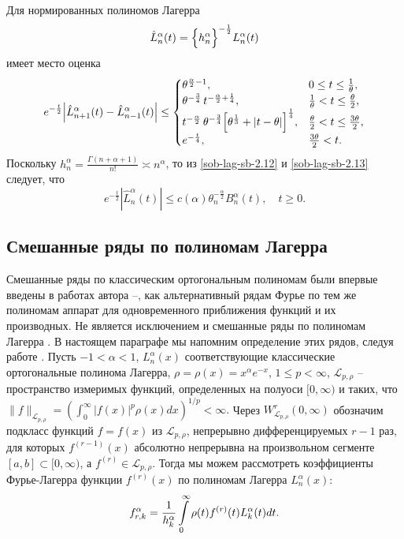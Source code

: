 Для нормированных полиномов Лагерра
\begin{equation}\label{sob-lag-sb-2.13}
\hat{L}_n^\alpha(t)=
\Bigl\{h_n^\alpha \Bigr\}^{-\frac{1}{2}} L_n^\alpha(t)
\end{equation}
имеет место оценка \cite{sob-lag-sb-AskeyWaiger}
\begin{equation}\label{sob-lag-sb-2.14}
e^{-\frac{t}{2}}
\Bigl|
\hat{L}_{n+1}^\alpha(t)-
\hat{L}_{n-1}^\alpha(t)
\Bigr|\le
\begin{cases}
\theta^{\frac{\alpha}{2}-1}, &0 \le t \le \frac{1}{\theta},\\
\theta^{-\frac{3}{4}}\,t^{-\frac{\alpha}{2} + \frac{1}{4}}, & \frac{1}{\theta} < t \le \frac{\theta}{2},\\
t^{-\frac{\alpha}{2}}\,
\theta^{-\frac{3}{4}}
\Bigl[
\theta^{\frac{1}{3}}+|t-\theta|
\Bigr]^{\frac{1}{4}}, & \frac{\theta}{2} < t \le \frac{3\theta}{2},\\
e^{-\frac{t}{4}}, &\frac{3\theta}{2}< t.
\end{cases}
\end{equation}
Поскольку $h_n^\alpha=\frac{\Gamma(n+\alpha+1)}{n!} \asymp n^\alpha$, то из \eqref{sob-lag-sb-2.12} и \eqref{sob-lag-sb-2.13} следует, что
\begin{equation}\label{sob-lag-sb-2.15}
e^{-\frac{t}{2}}
|\hat{L}_n^\alpha(t)|\le
c(\alpha)\theta_n^{-\frac{\alpha}{2}}B_n^\alpha(t), \quad t \ge 0.
\end{equation}

\subsection{Смешанные ряды по полиномам Лагерра}
Смешанные ряды по классическим ортогональным полиномам были впервые введены в работах автора \cite{sob-lag-sb-Shar11}--\cite{sob-lag-sb-Shar16}, как альтернативный
рядам Фурье по тем же полиномам аппарат для одновременного приближения функций и их производных. Не является исключением и смешанные ряды по полиномам Лагерра \cite{sob-lag-sb-Shar13}. В настоящем параграфе мы напомним определение этих рядов, следуя работе \cite{sob-lag-sb-Shar13}. Пусть $-1<\alpha<1$,      $L_n^\alpha(x)$ соответствующие классические ортогональные полинома Лагерра, $\rho=\rho(x)=x^\alpha e^{-x}$, $1\le p<\infty $,  $\mathcal{L}_{p,\rho}$ -- пространство измеримых функций,
определенных на полуоси $[0,\infty)$ и таких, что
     $
\|f\|_{\mathcal{L}_{p,\rho}}=
\left(\int_0^\infty|f(x)|^p\rho(x)dx\right)^{1/p}<\infty.
   $
 Через $W_{\mathcal{L}_{p,\rho}}^r(0,\infty)$ обозначим  подкласс функций $f=f(x)$ из $\mathcal{L}_{p,\rho}$,
непрерывно дифференцируемых $r-1$ раз, для которых $f^{(r-1)}(x)$
абсолютно непрерывна на произвольном сегменте $[a,b]\subset[0,\infty)$,
а $f^{(r)}\in \mathcal{L}_{p,\rho}$. Тогда мы можем рассмотреть
коэффициенты Фурье-Лагерра функции $f^{(r)}(x)$ по полиномам Лагерра
     $L_n^\alpha(x)$:
     \begin{equation}\label{sob-lag-sb-3.1}
f_{r,k}^\alpha=
{1\over h_k^\alpha}\int\limits_0^\infty\rho(t)f^{(r)}(t)L_k^\alpha(t)dt.
\end{equation}

